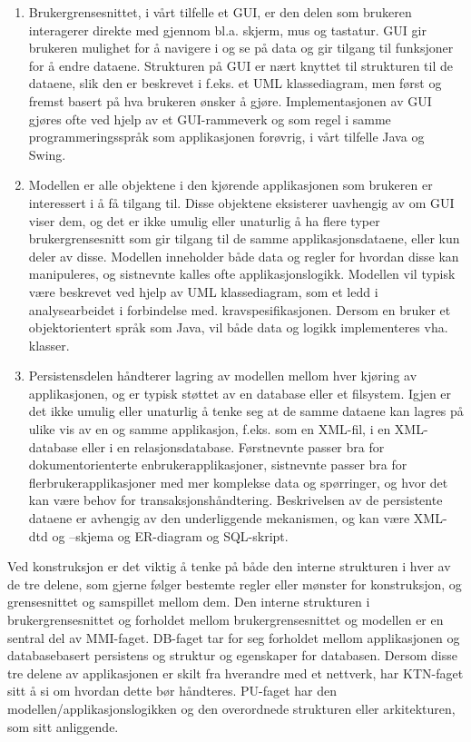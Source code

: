 \begin{enumerate}

\item
Brukergrensesnittet, i vårt tilfelle et GUI, er den delen som brukeren interagerer direkte med gjennom bl.a. skjerm, mus og tastatur. GUI gir brukeren mulighet for å navigere i og se på data og gir tilgang til funksjoner for å endre dataene. Strukturen på GUI er nært knyttet til strukturen til de dataene, slik den er beskrevet i f.eks. et UML klassediagram, men først og fremst basert på hva brukeren ønsker å gjøre. Implementasjonen av GUI gjøres ofte ved hjelp av et GUI-rammeverk og som regel i samme programmeringsspråk som applikasjonen forøvrig, i vårt tilfelle Java og Swing.

\item
Modellen er alle objektene i den kjørende applikasjonen som brukeren er interessert i å få tilgang til. Disse objektene eksisterer uavhengig av om GUI viser dem, og det er ikke umulig eller unaturlig å ha flere typer brukergrensesnitt som gir tilgang til de samme applikasjonsdataene, eller kun deler av disse. Modellen inneholder både data og regler for hvordan disse kan manipuleres, og sistnevnte kalles ofte applikasjonslogikk. Modellen vil typisk være beskrevet ved hjelp av UML klassediagram, som et ledd i analysearbeidet i forbindelse med. kravspesifikasjonen. Dersom en bruker et objektorientert språk som Java, vil både data og logikk implementeres vha. klasser. 

\item
Persistensdelen håndterer lagring av modellen mellom hver kjøring av applikasjonen, og er typisk støttet av en database eller et filsystem. Igjen er det ikke umulig eller unaturlig å tenke seg at de samme dataene kan lagres på ulike vis av en og samme applikasjon, f.eks. som en XML-fil, i en XML-database eller i en relasjonsdatabase. Førstnevnte passer bra for dokumentorienterte enbrukerapplikasjoner, sistnevnte passer bra for flerbrukerapplikasjoner med mer komplekse data og spørringer, og hvor det kan være behov for transaksjonshåndtering. Beskrivelsen av de persistente dataene er avhengig av den underliggende mekanismen, og kan være XML-dtd og –skjema og ER-diagram og SQL-skript.

\end{enumerate}

Ved konstruksjon er det viktig å tenke på både den interne strukturen i hver av de tre delene, som gjerne følger bestemte regler eller mønster for konstruksjon, og grensesnittet og samspillet mellom dem. Den interne strukturen i brukergrensesnittet og forholdet mellom brukergrensesnittet og modellen er en sentral del av MMI-faget. DB-faget tar for seg forholdet mellom applikasjonen og databasebasert persistens og struktur og egenskaper for databasen. Dersom disse tre delene av applikasjonen er skilt fra hverandre med et nettverk, har KTN-faget sitt å si om hvordan dette bør håndteres. PU-faget har den modellen/applikasjonslogikken og den overordnede strukturen eller arkitekturen, som sitt anliggende.


